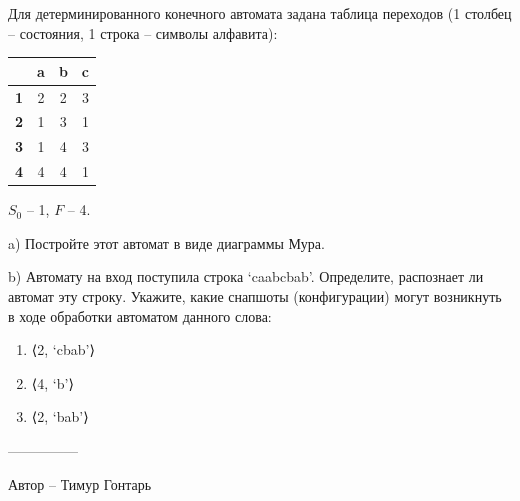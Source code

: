 \question
Для детерминированного конечного автомата задана таблица переходов (1 столбец – состояния, 1 строка – символы алфавита):

\begin{tabular}{||c | c |c| c||} 
 \hline
 & \textbf{a} & \textbf{b} & \textbf{c} \\ 
 \hline\hline
 \textbf{1} & 2& 2& 3\\ 
 \hline
 \textbf{2} & 1& 3& 1\\
 \hline
 \textbf{3} & 1& 4& 3\\
 \hline
 \textbf{4} & 4& 4& 1\\
 \hline
\end{tabular}

$S_0$ – 1, $F$ – {4}.

a) Постройте этот автомат в виде диаграммы Мура.

b) Автомату на вход поступила строка ‘caabcbab’. Определите, распознает ли автомат эту строку. Укажите, какие снапшоты (конфигурации) могут возникнуть в ходе обработки автоматом данного слова:

\begin{enumerate}
    \item ⟨2, ‘cbab’⟩
    \item ⟨4, ‘b’⟩
    \item ⟨2, ‘bab’⟩
\end{enumerate}

---------------

Автор -- Тимур Гонтарь
